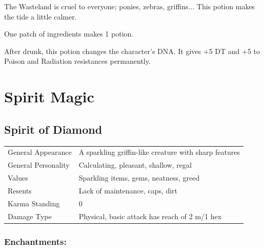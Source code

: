\documentclass[11pt,a4paper,twocolumn]{book}
\begin{document}
\medskip

The Wasteland is cruel to everyone; ponies, zebras, griffins... This potion makes the tide a little calmer.

One patch of ingredients makes 1 potion.

After drunk, this potion changes the character's DNA. It gives +5 DT and +5 to Poison and Radiation resistances permanently.
\clearpage

\section*{Spirit Magic}

\subsection*{Spirit of Diamond}
{
	\begin{tabu} to 75mm{| X[l,4] | X[l,8] |}
		\hline
		General Appearance		& A sparkling griffin-like creature with sharp features		\\
        General Personality	   	& Calculating, pleasant, shallow, regal						\\
        Values     				& Sparkling items, gems, neatness, greed					\\
        Resents     			& Lack of maintenance, caps, dirt 							\\
        Karma Standing      	& 0															\\
        Damage Type 			& Physical, basic attack has reach of 2 m/1 hex	 			\\ \hline
	\end{tabu}
		
}

\medskip
\subsubsection*{Enchantments:}
\end{document}
